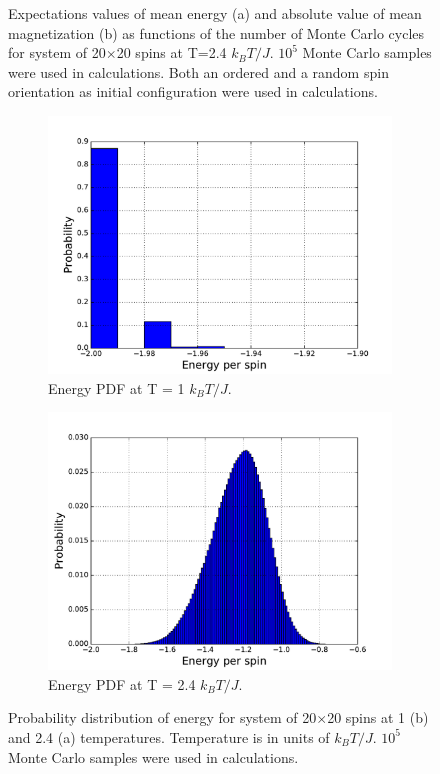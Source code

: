 \documentclass[10pt]{article}
\begin{document}
\begin{figure}
\caption{Expectations values of mean energy (a) and absolute value of mean magnetization (b) as functions
of the number of Monte Carlo cycles for system of 20$\times$20 spins at T=2.4 $k_BT/J$. $10^5$ Monte Carlo samples were used in calculations. 
Both an ordered and a random spin orientation as initial configuration were used in calculations.}
\end{figure}

\clearpage

\newpage
\begin{figure}
\centering
   \begin{subfigure}[b]{1\textwidth}
   \includegraphics[width=0.9\linewidth]{Energy_pdf_20_T_1}
   \caption{Energy PDF at T = 1 $k_BT/J$.}
   \label{fig:prob1} 
\end{subfigure}

\begin{subfigure}[b]{1\textwidth}
   \includegraphics[width=0.9\linewidth]{Energy_pdf_20_24}
   \caption{Energy PDF at T = 2.4 $k_BT/J$.}
   \label{fig:prob24}
\end{subfigure}

\caption{Probability distribution of energy for system of 20$\times$20 spins at 1 (b) and 2.4 (a) temperatures.
Temperature is in units of $k_BT/J$. $10^5$ Monte Carlo samples were used in calculations.}
\end{figure}
\clearpage
\end{document}
